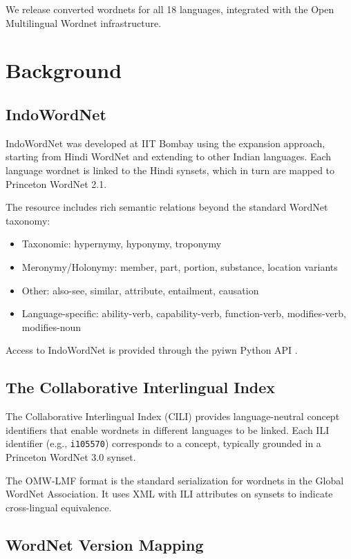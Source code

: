 \documentclass[11pt]{article}
\begin{document}
We release converted wordnets for all 18 languages, integrated with the Open Multilingual Wordnet infrastructure.

\section{Background}

\subsection{IndoWordNet}

IndoWordNet \cite{bhattacharyya2010indowordnet} was developed at IIT Bombay using the expansion approach, starting from Hindi WordNet and extending to other Indian languages.
Each language wordnet is linked to the Hindi synsets, which in turn are mapped to Princeton WordNet 2.1.

The resource includes rich semantic relations beyond the standard WordNet taxonomy:
\begin{itemize}
\item Taxonomic: hypernymy, hyponymy, troponymy
\item Meronymy/Holonymy: member, part, portion, substance, location variants
\item Other: also-see, similar, attribute, entailment, causation
\item Language-specific: ability-verb, capability-verb, function-verb, modifies-verb, modifies-noun
\end{itemize}

Access to IndoWordNet is provided through the pyiwn Python API \cite{panjwani2018pyiwn}.

\subsection{The Collaborative Interlingual Index}

The Collaborative Interlingual Index (CILI) \cite{bond2016cili} provides language-neutral concept identifiers that enable wordnets in different languages to be linked.
Each ILI identifier (e.g., \texttt{i105570}) corresponds to a concept, typically grounded in a Princeton WordNet 3.0 synset.

The OMW-LMF format \cite{mccrae2019gwn} is the standard serialization for wordnets in the Global WordNet Association.
It uses XML with ILI attributes on synsets to indicate cross-lingual equivalence.

\subsection{WordNet Version Mapping}
\end{document}
